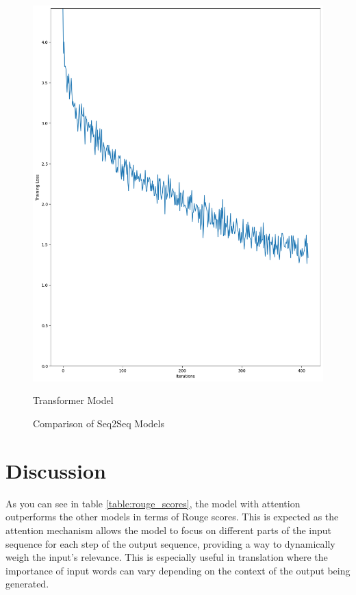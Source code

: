 \documentclass{article}
\begin{document}
\begin{figure}[htbp]
\begin{minipage}[b]{0.2\textwidth}
        \includegraphics[width=\textwidth]{img/Attention_learning.png}
        \caption{Transformer Model}
        \label{fig:transformer}
    \end{minipage}
    \caption{Comparison of Seq2Seq Models}
    \label{fig:seq2seq_models}
\end{figure}

\section{Discussion}

As you can see in table \ref{table:rouge_scores}, the model with attention outperforms the other models in terms of Rouge scores. This is expected as the attention mechanism allows the model to focus on different parts of the input sequence for each step of the output sequence, providing a way to dynamically weigh the input's relevance. This is especially useful in translation where the importance of input words can vary depending on the context of the output being generated.
\end{document}

